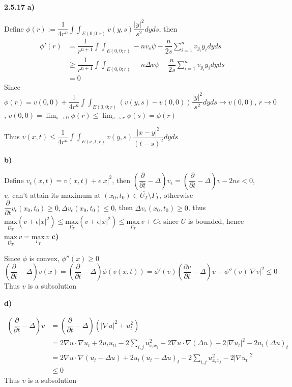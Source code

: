 \documentclass[../main.tex]{subfiles}
\begin{document}
\begin{customproblem}\textbf{2.5.17}
\textbf{a)} \par
Define $\displaystyle \phi(r):=\dfrac{1}{4r^{n}}\int\int_{E(0,0;r)}v(y,s)\dfrac{|y|^{2}}{s^{2}}dyds$, then
\[
\begin{aligned}
\phi'(r)
&=\dfrac{1}{r^{n+1}}\int\int_{E(0,0;r)}-nv_{s}\psi-\dfrac{n}{2s}\sum_{i=1}^{n}v_{y_{i}}y_{i}dyds \\
&\geq\dfrac{1}{r^{n+1}}\int\int_{E(0,0;r)}-n\Delta v\psi-\dfrac{n}{2s}\sum_{i=1}^{n}v_{y_{i}}y_{i}dyds \\
&=0
\end{aligned}
\]
Since $\displaystyle\phi(r)=v(0,0)+\dfrac{1}{4r^{n}}\int\int_{E(0,0;r)}\left(v(y,s)-v(0,0)\right)\dfrac{|y|^{2}}{s^{2}}dyds\rightarrow v(0,0), \,r\rightarrow 0$, $\displaystyle v(0,0)=\lim_{s\rightarrow 0}\phi(r)\leq\lim_{s\rightarrow r}\phi(s)=\phi(r)$ \par
Thus $\displaystyle v(x,t)\leq\dfrac{1}{4r^{n}}\int\int_{E(x,t;r)}v(y,s)\dfrac{|x-y|^{2}}{(t-s)^{2}}dyds$ \par
\textbf{b)} \par
Define $v_{\epsilon}(x,t)=v(x,t)+\epsilon|x|^{2}$, then $\left(\dfrac{\partial}{\partial t}-\Delta\right)v_{\epsilon}=\left(\dfrac{\partial}{\partial t}-\Delta\right)v-2n\epsilon<0$, $v_{\epsilon}$ can't attain its maximum at $(x_{0},t_{0})\in \overline{U_{T}}\setminus\Gamma_{T}$, otherwise $\dfrac{\partial}{\partial t}v_{\epsilon}(x_{0},t_{0})\geq 0, \Delta v_{\epsilon}(x_{0},t_{0})\leq 0$, then $\Delta v_{\epsilon}(x_{0},t_{0})\geq 0$, thus $\underset{\overline{U_{T}}}{\mathrm{max}}\left(v+\epsilon|x|^{2}\right)\leq\underset{\Gamma_{T}}{\mathrm{max}}\left(v+\epsilon|x|^{2}\right)\leq \underset{\Gamma_{T}}{\mathrm{max}} \,v+C\epsilon$ since $U$ is bounded, hence $\underset{\overline{U_{T}}}{\mathrm{max}}\,v=\underset{\Gamma_{T}}{\mathrm{max}} \,v$
\textbf{c)} \par
Since $\phi$ is convex, $\phi''(x)\geq 0$
\[
\left(\dfrac{\partial}{\partial t}-\Delta\right) v(x)=\left(\dfrac{\partial}{\partial t}-\Delta\right)\phi\left(v(x,t)\right)=\phi'(v)\left(\dfrac{\partial v}{\partial t}-\Delta\right)v-\phi''(v)|\nabla v|^{2}\leq 0
\]
Thus $v$ is a subsolution \par
\textbf{d)} \par
\[
\begin{aligned}
\left(\dfrac{\partial}{\partial t}-\Delta\right)v 
&= \left(\dfrac{\partial}{\partial t}-\Delta\right) \left(\left|\nabla u\right|^{2}+u_{t}^{2}\right)  \\
&= 2\nabla u \cdot \nabla u_{t}+2u_{t}u_{tt}-2\sum_{i,j}u_{x_{i}x_{j}}^{2}-2 \nabla u \cdot \nabla(\Delta u)-2|\nabla u_{t}|^{2}-2u_{t}(\Delta u)_{t} \\
&=2\nabla u \cdot \nabla (u_{t}-\Delta u)+2u_{t}(u_{t}-\Delta u)_{t}-2\sum_{i,j}u_{x_{i}x_{j}}^{2}-2|\nabla u_{t}|^{2} \\
&\leq 0
\end{aligned}
\]
Thus $v$ is a subsolution
\end{customproblem}
\end{document}
